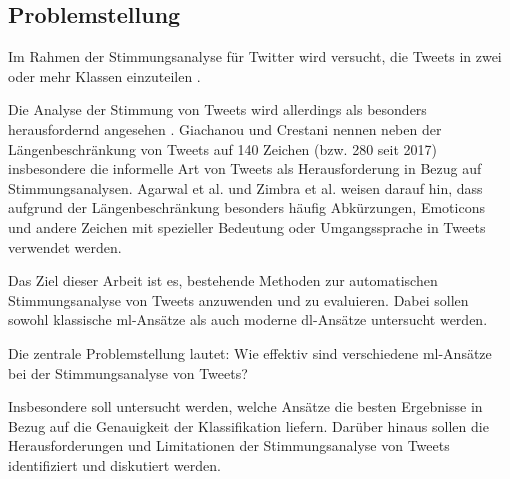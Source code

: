 \subsection{Problemstellung}

Im Rahmen der Stimmungsanalyse für Twitter wird versucht, die Tweets in zwei oder mehr Klassen einzuteilen \cite{zimbra2018state}.

Die Analyse der Stimmung von Tweets wird allerdings als besonders herausfordernd angesehen \cite{agarwal2011sentiment, giachanou2016like, zimbra2018state}.
Giachanou und Crestani \cite{giachanou2016like} nennen neben der Längenbeschränkung von Tweets auf 140 Zeichen (bzw. 280 seit 2017) insbesondere die informelle Art von Tweets als Herausforderung in Bezug auf Stimmungsanalysen.
Agarwal et al. \cite{agarwal2011sentiment} und Zimbra et al. \cite{zimbra2018state} weisen darauf hin, dass aufgrund der Längenbeschränkung besonders häufig Abkürzungen, Emoticons und andere Zeichen mit spezieller Bedeutung oder Umgangssprache in Tweets verwendet werden.

Das Ziel dieser Arbeit ist es, bestehende Methoden zur automatischen Stimmungsanalyse von Tweets anzuwenden und zu evaluieren.
Dabei sollen sowohl klassische \gls{ml}-Ansätze als auch moderne \gls{dl}-Ansätze untersucht werden.

Die zentrale Problemstellung lautet: Wie effektiv sind verschiedene \gls{ml}-Ansätze bei der Stimmungsanalyse von Tweets?

Insbesondere soll untersucht werden, welche Ansätze die besten Ergebnisse in Bezug auf die Genauigkeit der Klassifikation liefern.
Darüber hinaus sollen die Herausforderungen und Limitationen der Stimmungsanalyse von Tweets identifiziert und diskutiert werden.
